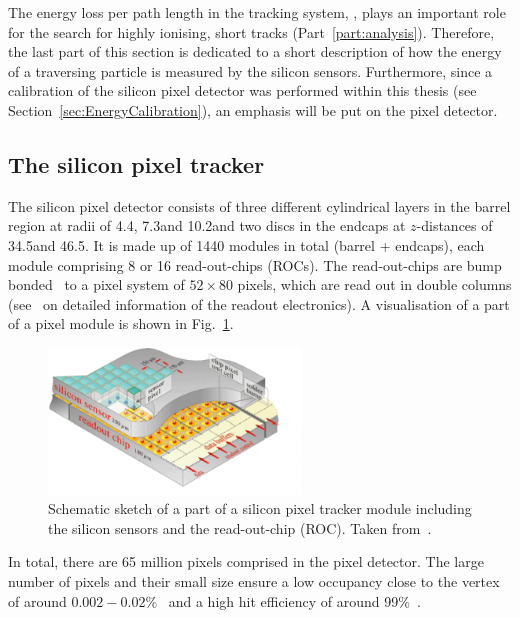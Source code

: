 The energy loss per path length in the tracking system, \dedx, plays an important role for the search for highly ionising, short tracks (Part~\ref{part:analysis}).
Therefore, the last part of this section is dedicated to a short description of how the energy of a traversing particle is measured by the silicon sensors.
Furthermore, since a calibration of the silicon pixel detector was performed within this thesis (see Section~\ref{sec:EnergyCalibration}), an emphasis will be put on the pixel detector.

\subsection*{The silicon pixel tracker}
The silicon pixel detector consists of three different cylindrical layers in the barrel region at radii of 4.4\cm, 7.3\cm and 10.2\cm and two discs in the endcaps at $z$-distances of 34.5\cm and 46.5\cm.
It is made up of 1440 modules in total (barrel + endcaps), each module comprising 8 or 16 read-out-chips (ROCs).
The read-out-chips are bump bonded~\cite{Thesis_Jenny} to a pixel system of $52\times80$ pixels, which are read out in double columns (see~\cite{Thesis_Jenny} on detailed information of the readout electronics).
A visualisation of a part of a pixel module is shown in Fig.~\ref{fig:PixelTracker}.
\begin{figure}[!b]
  \centering
      \includegraphics[width=0.60\textwidth]{figures/experiment/CMS/Pixelement.png}
  \caption{Schematic sketch of a part of a silicon pixel tracker module including the silicon sensors and the read-out-chip (ROC). Taken from~\cite{bib:PixelModule}.}  
  \label{fig:PixelTracker}
\end{figure}
In total, there are 65 million pixels comprised in the pixel detector.
The large number of pixels and their small size ensure a low occupancy close to the vertex of around $0.002 - 0.02$\%~\cite{bib:CMS:tracking_8TeV} and a high hit efficiency of around 99\%~\cite{bib:CMS:PixelSpatialResolution}. 

